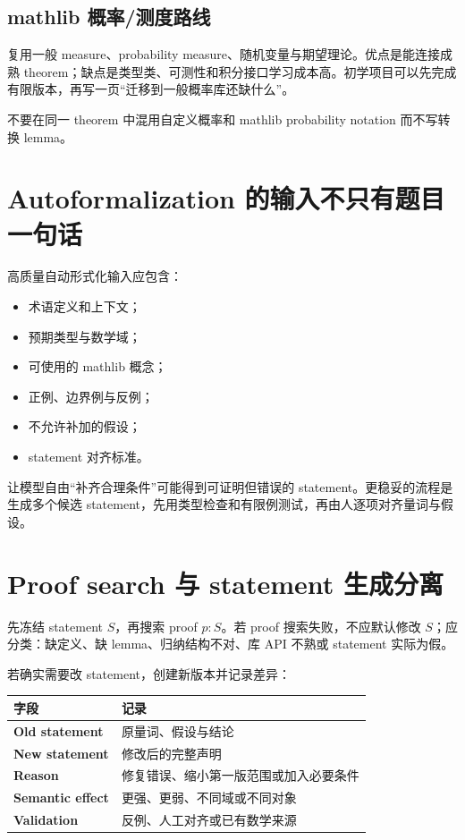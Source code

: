 \subsection{mathlib 概率/测度路线}

复用一般 measure、probability measure、随机变量与期望理论。优点是能连接成熟 theorem；缺点是类型类、可测性和积分接口学习成本高。初学项目可以先完成有限版本，再写一页“迁移到一般概率库还缺什么”。

不要在同一 theorem 中混用自定义概率和 mathlib probability notation 而不写转换 lemma。

\section{Autoformalization 的输入不只有题目一句话}

高质量自动形式化输入应包含：
\begin{itemize}
  \item 术语定义和上下文；
  \item 预期类型与数学域；
  \item 可使用的 mathlib 概念；
  \item 正例、边界例与反例；
  \item 不允许补加的假设；
  \item statement 对齐标准。
\end{itemize}

让模型自由“补齐合理条件”可能得到可证明但错误的 statement。更稳妥的流程是生成多个候选 statement，先用类型检查和有限例测试，再由人逐项对齐量词与假设。

\section{Proof search 与 statement 生成分离}

先冻结 statement $S$，再搜索 proof $p:S$。若 proof 搜索失败，不应默认修改 $S$；应分类：缺定义、缺 lemma、归纳结构不对、库 API 不熟或 statement 实际为假。

若确实需要改 statement，创建新版本并记录差异：
\begin{center}
\begin{tabularx}{0.94\textwidth}{>{\bfseries}lX}
\toprule
字段 & 记录 \\
\midrule
Old statement & 原量词、假设与结论 \\
New statement & 修改后的完整声明 \\
Reason & 修复错误、缩小第一版范围或加入必要条件 \\
Semantic effect & 更强、更弱、不同域或不同对象 \\
Validation & 反例、人工对齐或已有数学来源 \\
\bottomrule
\end{tabularx}
\end{center}

